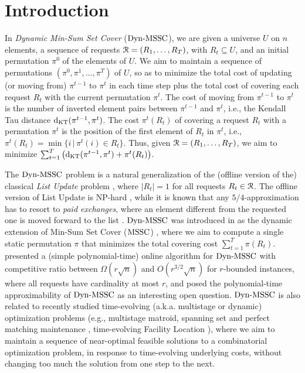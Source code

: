 \section{Introduction}
\label{s:intro}

In \emph{Dynamic Min-Sum Set Cover} ($\mathrm{Dyn}\text{-}\mathrm{MSSC}$), we are given a universe $U$ on $n$ elements, a sequence of requests $\mathcal{R} = (R_1, \ldots, R_T)$, with $R_t \subseteq U$, and an initial permutation $\pi^0$ of the elements of $U$. We aim to maintain a sequence of permutations $(\pi^0, \pi^1, \ldots, \pi^T)$ of $U$, so as to minimize the total cost of updating (or moving from) $\pi^{t-1}$ to $\pi^{t}$ in each time step plus the total cost of covering each request $R_t$ with the current permutation $\pi^t$. The cost of moving from $\pi^{t-1}$ to $\pi^{t}$ is the number of inverted element pairs between $\pi^{t-1}$ and $\pi^t$, i.e., the Kendall Tau distance $\mathrm{d}_{\mathrm{KT}}(\pi^{t-1}, \pi^t)$. The cost $\pi^t(R_t)$ of covering a request $R_t$ with a permutation $\pi^t$ is the position of the first element of $R_t$ in $\pi^t$, i.e., $\pi^t(R_t) = \min\{ i \,|\, \pi^t(i) \in R_t \}$. Thus, given $\mathcal{R} = (R_1, \ldots, R_T)$, we aim to minimize $\sum_{t=1}^T \big( \mathrm{d}_{\mathrm{KT}}(\pi^{t-1}, \pi^t) + \pi^t(R_t) \big)$. 
%

The $\mathrm{Dyn}\text{-}\mathrm{MSSC}$ problem is a natural generalization of the (offline version of the) classical \emph{List Update} problem \cite{ST85b}, where $|R_t| = 1$ for all requests $R_t \in \mathcal{R}$. The offline version of List Update is $\mathrm{NP}$-hard \cite{Amb00}, while it is known that any $5/4$-approximation has to resort to \emph{paid exchanges}, where an element different from the requested one is moved forward to the list \cite{LRR15,tim16}. $\mathrm{Dyn}\text{-}\mathrm{MSSC}$ was introduced in \cite{FKKSV20} as the dynamic extension of Min-Sum Set Cover ($\mathrm{MSSC}$) \cite{FLT04}, where we aim to compute a single static permutation $\pi$ that minimizes the total covering cost  $\sum_{t=1}^T \pi(R_t)$. \cite{FKKSV20} presented a (simple polynomial-time) online algorithm for $\mathrm{Dyn}\text{-}\mathrm{MSSC}$ with competitive ratio between $\Omega(r \sqrt{n})$ and $O(r^{3/2} \sqrt{n})$ for $r$-bounded instances, where all requests have cardinality at most $r$, and posed the polynomial-time approximability of $\mathrm{Dyn}\text{-}\mathrm{MSSC}$ as an interesting open question. $\mathrm{Dyn}\text{-}\mathrm{MSSC}$ is also related to recently studied time-evolving (a.k.a. multistage or dynamic) optimization problems (e.g., multistage matroid, spanning set and perfect matching maintenance \cite{GTW14}, time-evolving Facility Location \cite{EMS14,Svensson15}), where we aim to maintain a sequence of near-optimal feasible solutions to a combinatorial optimization problem, in response to time-evolving underlying costs, without changing too much the solution from one step to the next. 

